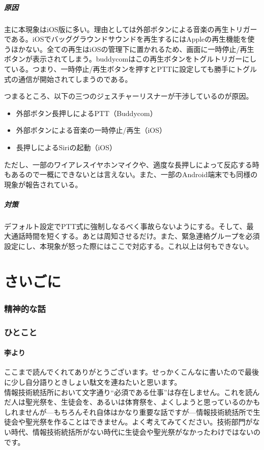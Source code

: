 \documentclass[dvipdfmx,jb5]{jarticle}
\begin{document}
\subsubsection{原因}
主に本現象はiOS版に多い。理由としては外部ボタンによる音楽の再生トリガーである。iOSでバッググラウンドサウンドを再生するにはAppleの再生機能を使うほかない。全ての再生はiOSの管理下に置かれるため、画面に一時停止/再生ボタンが表示されてしまう。buddycomはこの再生ボタンをトグルトリガーにしている。つまり、一時停止/再生ボタンを押すとPTTに設定しても勝手にトグル式の通信が開始されてしまうのである。
\par
つまるところ、以下の三つのジェスチャーリスナーが干渉しているのが原因。
\begin{itemize}
\item 外部ボタン長押しによるPTT（Buddycom）
\item 外部ボタンによる音楽の一時停止/再生（iOS）
\item 長押しによるSiriの起動（iOS）
\end{itemize}
ただし、一部のワイアレスイヤホンマイクや、適度な長押しによって反応する時もあるので一概にできないとは言えない。また、一部のAndroid端末でも同様の現象が報告されている。
\subsubsection{対策}
デフォルト設定でPTT式に強制しなるべく事故らないようにする。そして、最大通話時間を短くする。あとは周知させるだけ。また、緊急連絡グループを必須設定にし、本現象が怒った際にはここで対応する。これ以上は何もできない。
\newpage

 \part{さいごに}
 \section{精神的な話}
 \section{ひとこと}
 \subsection{李より}
 ここまで読んでくれてありがとうございます。せっかくこんなに書いたので最後に少し自分語りときしょい駄文を連ねたいと思います。
 \\

 情報技術統括所において文字通り``必須である仕事''は存在しません。これを読んだ人は聖光祭を、生徒会を、あるいは体育祭を、よくしようと思っているのかもしれませんが---もちろんそれ自体はかなり重要な話ですが---情報技術統括所で生徒会や聖光祭を作ることはできません。よく考えてみてください。技術部門がない時代、情報技術統括所がない時代に生徒会や聖光祭がなかったわけではないのです。
 \\
\end{document}
